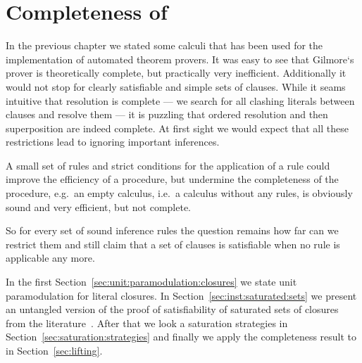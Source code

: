 
\chapter{Completeness of \InstGenEQ}

In the previous chapter we stated some calculi
that has been used for the implementation
of automated theorem provers.
%
It was easy to see that Gilmore`s prover is theoretically complete,
but practically very inefficient.
Additionally it would not stop for clearly satisfiable and simple sets of clauses.
While it seams intuitive that resolution is complete
--- we search for all clashing literals between clauses and resolve them ---
it is puzzling that ordered resolution and then superposition are indeed complete.
At first sight we would expect that all these restrictions
lead to ignoring important inferences.

A small set of rules and strict conditions for the application of a rule
could improve the efficiency of a procedure, but undermine the completeness
of the procedure, e.g.~an empty calculus,
i.e.~a calculus without any rules,
is obviously sound and very efficient, but not complete.

So for every set of sound inference rules the question remains
how far can we restrict them and still claim
that a set of clauses is satisfiable when no rule is applicable any more.







In the first Section~\vref{sec:unit:paramodulation:closures}
we state unit paramodulation for literal closures.
In Section~\vref{sec:inst:saturated:sets} we present
an untangled version of the proof of satisfiability
of saturated sets of closures
from the literature~\cite{GK2004csl}.
After that we look a saturation strategies in
Section~\vref{sec:saturation:strategies}
and finally we apply the completeness result to \InstGenEQ{}
in Section~\vref{sec:lifting}.



